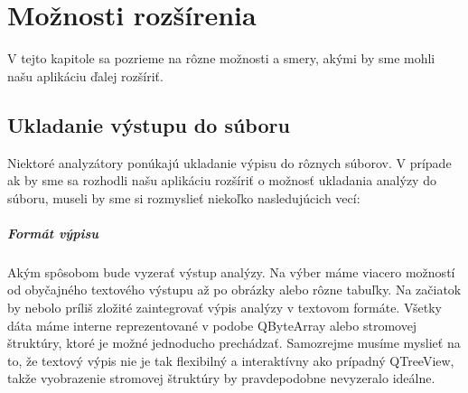 \chapter{Možnosti rozšírenia}
V tejto kapitole sa pozrieme na rôzne možnosti a smery, akými by sme mohli našu aplikáciu ďalej rozšíriť.
\section{Ukladanie výstupu do súboru}
Niektoré analyzátory ponúkajú ukladanie výpisu do rôznych súborov. V prípade ak by sme sa rozhodli našu aplikáciu rozšíriť o možnosť ukladania analýzy do súboru, museli by sme si rozmyslieť niekoľko nasledujúcich vecí:

\paragraph{Formát výpisu}
\hfill \break
Akým spôsobom bude vyzerať výstup analýzy. Na výber máme viacero možností od obyčajného textového výstupu až po obrázky alebo rôzne tabuľky. Na začiatok by nebolo príliš zložité zaintegrovať výpis analýzy v textovom formáte. Všetky dáta máme interne reprezentované v podobe QByteArray alebo stromovej štruktúry, ktoré je možné jednoducho prechádzať. Samozrejme musíme myslieť na to, že textový výpis nie je tak flexibilný a interaktívny ako prípadný QTreeView, takže vyobrazenie stromovej štruktúry by pravdepodobne nevyzeralo ideálne.

